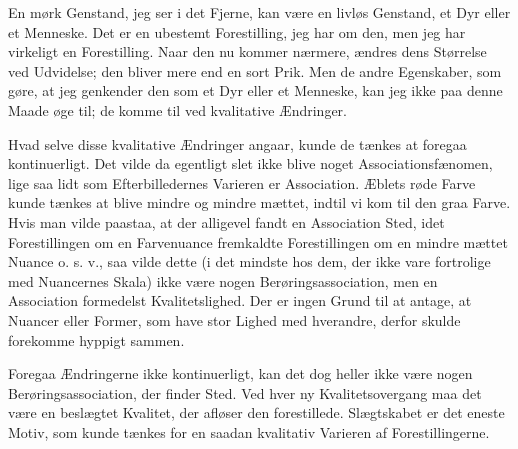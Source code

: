 \documentclass[12pt,a4paper,openany]{book}
\newcommand{\opage}[1]{\marginnote{\footnotesize\textit{[#1]}}}
\begin{document}
En mørk Genstand, jeg ser i det Fjerne, kan være en livløs Genstand, et Dyr
eller et Menneske. Det er en ubestemt Forestilling, jeg har om den, men jeg har
virkeligt en
\setcounter{footnote}{0}%
\opage{48}Forestilling. Naar den nu kommer nærmere, ændres dens Størrelse ved
Udvidelse; den bliver mere end en sort Prik. Men de andre Egenskaber, som gøre,
at jeg genkender den som et Dyr eller et Menneske, kan jeg ikke paa denne Maade
øge til; de komme til ved kvalitative Ændringer.

Hvad selve disse kvalitative Ændringer angaar, kunde de tænkes at foregaa
kontinuerligt. Det vilde da egentligt slet ikke blive noget
Associationsfænomen, lige saa lidt som Efterbilledernes Varieren er
Association. Æblets røde Farve kunde tænkes at blive mindre og mindre mættet,
indtil vi kom til den graa Farve. Hvis man vilde paastaa, at der alligevel
fandt en Association Sted, idet Forestillingen om en Farvenuance fremkaldte
Forestillingen om en mindre mættet Nuance o. s. v., saa vilde dette (i det
mindste hos dem, der ikke vare fortrolige med Nuancernes Skala) ikke være nogen
Berøringsassociation, men en Association formedelst Kvalitetslighed. Der er
ingen Grund til at antage, at Nuancer eller Former, som have stor Lighed med
hverandre, derfor skulde forekomme hyppigt sammen.

Foregaa Ændringerne ikke kontinuerligt, kan det dog heller ikke være nogen
Berøringsassociation, der finder Sted. Ved hver ny Kvalitetsovergang maa det
være en beslægtet Kvalitet, der afløser den forestillede. Slægtskabet er det
eneste Motiv, som kunde tænkes for en saadan kvalitativ Varieren af Forestillingerne.
\end{document}
